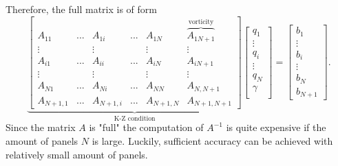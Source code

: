 \documentclass[a4paper,12pt]{article}
\begin{document}
Therefore, the full matrix is of form
\begin{equation}
\underbrace{
\begin{bmatrix}
 A_{11}&...  & A_{1i}  &...  &A_{1N}  &\overbrace{ A_{1N+1} }^{\text{vorticity}}\\ 
 \vdots&  &  \vdots&  &  \vdots& \vdots \\
 A_{i1} & ... & A_{ii}  & ...  & A_{iN} & A_{iN+1} \\  
 \vdots&  &  \vdots&  &  \vdots& \vdots \\ 
 A_{N1}&...  & A_{Ni}  &...  &A_{NN}  & A_{N,N+1} \\ 
 A_{N+1, 1}&...  & A_{N+1, i}  &...  &A_{N+1,N}  & A_{N+1,N+1}
\end{bmatrix}
}_{\text{K-Z condition}}
\begin{bmatrix}
q_1\\ 
\vdots\\ 
q_i\\ 
\vdots\\ 
q_{N}\\
\gamma\\ 
\end{bmatrix}
=
\begin{bmatrix}
b_1\\ 
\vdots\\ 
b_i\\ 
\vdots\\ 
b_{N}\\
b_{N+1} 
\end{bmatrix}.
\end{equation}
Since the matrix $A$ is "full" the computation of $A^{-1}$ is quite expensive if the amount of panels $N$ is large. Luckily, sufficient accuracy can be achieved with relatively small amount of panels. 
\end{document}
